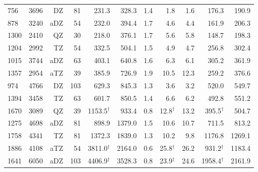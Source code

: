 \begin{table}[H]
\begin{tabular}{lrrrrrrrrrr}
 756& 3696&    DZ&    81&               231.3 &              328.3&     1.4 &                1.8 &                1.6&               176.3&               190.9\\
 878& 3240&   aDZ&    54&               232.0 &              394.4&     1.7 &                4.6 &                4.4&               161.9&               206.3\\
1300& 2410&    QZ&    30&               218.0 &              376.1&     1.7 &                5.6 &                5.8&               148.7&               198.3\\
1204& 2992&    TZ&    54&               332.5 &              504.1&     1.5 &                4.9 &                4.7&               256.8&               302.4\\
1015& 3744&   aDZ&    63&               403.1 &              640.8&     1.6 &                6.3 &                6.1&               305.2&               361.9\\
1357& 2954&   aTZ&    39&               385.9 &              726.9&     1.9 &               10.5 &               12.3&               259.2&               376.6\\
 974& 4766&    DZ&   103&               629.3 &              845.3&     1.3 &                3.6 &                3.2&               520.0&               549.7\\
1394& 3458&    TZ&    63&               601.7 &              850.5&     1.4 &                6.6 &                6.2&               492.8&               551.2\\
1670& 3089&    QZ&    39&  1153.5$^{\dagger}$ &              933.4&     0.8 &   12.8$^{\dagger}$ &               13.2&   395.5$^{\dagger}$&               504.7\\
1275& 4698&   aDZ&    81&               898.9 &             1379.0&     1.5 &               10.6 &               10.7&               711.5&               813.2\\
1758& 4341&    TZ&    81&              1372.3 &             1839.0&     1.3 &               10.2 &                9.8&              1176.8&              1269.1\\
1886& 4108&   aTZ&    54&  3811.0$^{\dagger}$ &             2164.0&     0.6 &   25.8$^{\dagger}$ &               26.2&   931.2$^{\dagger}$&              1183.4\\
1641& 6050&   aDZ&   103&  4406.9$^{\dagger}$ &             3528.3&     0.8 &   23.9$^{\dagger}$ &               24.6&  1958.4$^{\dagger}$&              2161.9\\

\end{tabular}
\end{table}
